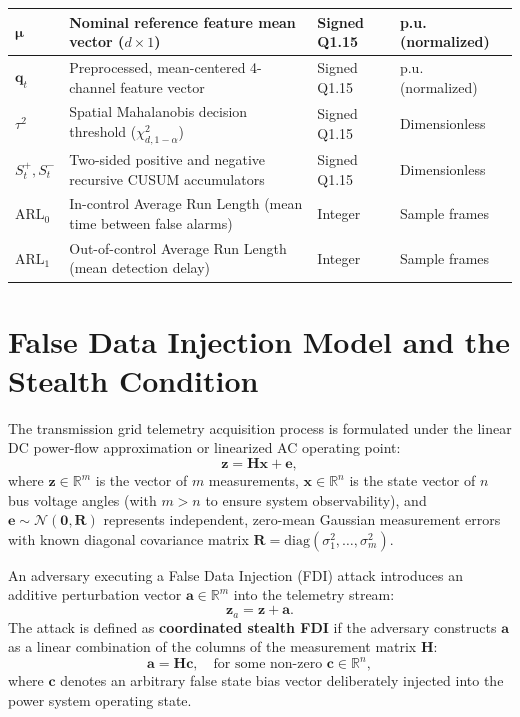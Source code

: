 \documentclass[11pt,a4paper]{report}
\begin{document}
\begin{table}[H]
\begin{tabular}{|p{2.2cm}|p{7.2cm}|p{2.6cm}|p{2.2cm}|}
\hline
$\boldsymbol{\mu}$ & Nominal reference feature mean vector ($d \times 1$) & Signed Q1.15 & p.u. (normalized) \\
\hline
$\boldsymbol{q}_t$ & Preprocessed, mean-centered 4-channel feature vector & Signed Q1.15 & p.u. (normalized) \\
\hline
$\tau^2$ & Spatial Mahalanobis decision threshold ($\chi^2_{d, 1-\alpha}$) & Signed Q1.15 & Dimensionless \\
\hline
$S_t^+, S_t^-$ & Two-sided positive and negative recursive CUSUM accumulators & Signed Q1.15 & Dimensionless \\
\hline
$\text{ARL}_0$ & In-control Average Run Length (mean time between false alarms)& Integer & Sample frames \\
\hline
$\text{ARL}_1$ & Out-of-control Average Run Length (mean detection delay) & Integer & Sample frames \\
\hline
\end{tabular}
\end{table}

\section{False Data Injection Model and the Stealth Condition}
The transmission grid telemetry acquisition process is formulated under the linear DC
power-flow approximation or linearized AC operating point:
\begin{equation}
\boldsymbol{z} = \boldsymbol{H}\boldsymbol{x} + \boldsymbol{e},
\label{eq:ch3_dc_model}
\end{equation}
where $\boldsymbol{z} \in \mathbb{R}^m$ is the vector of $m$ measurements, $\boldsymbol{x} \in \mathbb{R}^n$
is the state vector of $n$ bus voltage angles (with $m > n$ to ensure system observability),
and $\boldsymbol{e} \sim \mathcal{N}(\boldsymbol{0}, \boldsymbol{R})$ represents independent,
zero-mean Gaussian measurement errors with known diagonal covariance matrix
$\boldsymbol{R} = \text{diag}(\sigma_1^2, \dots, \sigma_m^2)$.

An adversary executing a False Data Injection (FDI) attack introduces an additive
perturbation vector $\boldsymbol{a} \in \mathbb{R}^m$ into the telemetry stream:
\begin{equation}
\boldsymbol{z}_a = \boldsymbol{z} + \boldsymbol{a}.
\label{eq:ch3_attack_stream}
\end{equation}
The attack is defined as \textbf{coordinated stealth FDI} if the adversary constructs
$\boldsymbol{a}$ as a linear combination of the columns of the measurement matrix $\boldsymbol{H}$:
\begin{equation}
\boldsymbol{a} = \boldsymbol{H}\boldsymbol{c}, \quad \text{for some non-zero } \boldsymbol{c} \in \mathbb{R}^n,
\label{eq:ch3_stealth_definition}
\end{equation}
where $\boldsymbol{c}$ denotes an arbitrary false state bias vector deliberately injected
into the power system operating state.
\end{document}
